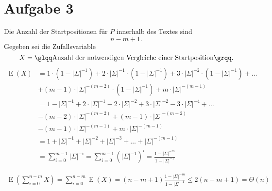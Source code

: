 \documentclass[a4paper, 11pt]{article}
\begin{document}
    \section*{Aufgabe 3}
    \newcommand{\Sig}[1]{|\Sigma|^{#1}}

    Die Anzahl der Startpositionen für $P$ innerhalb des Textes sind
    \begin{equation*}
        n - m + 1
        \text{.}
    \end{equation*}
    Gegeben sei die Zufallsvariable
    \begin{equation*}
        X = \text{{\glqq}Anzahl der notwendigen Vergleiche einer Startposition{\grqq}}
        \text{.}
    \end{equation*}
    \begin{align*}
        \operatorname{E}(X) &=
        1 \cdot \left( 1 - \Sig{-1} \right) + 2 \cdot \Sig{-1} \cdot \left( 1 - \Sig{-1} \right) + 3 \cdot \Sig{-2} \cdot \left( 1 - \Sig{-1} \right) + \dots \\
        &+ (m - 1) \cdot \Sig{-(m - 2)} \cdot \left( 1 - \Sig{-1} \right) + m \cdot \Sig{-(m - 1)} \\
        &= 1 - \Sig{-1} + 2 \cdot \Sig{-1} - 2 \cdot \Sig{-2} + 3 \cdot \Sig{-2} - 3 \cdot \Sig{-4} + \dots \\
        &- (m - 2) \cdot \Sig{-(m - 2)} + (m - 1) \cdot \Sig{-(m - 2)} \\
        &- (m - 1) \cdot \Sig{-(m - 1)} + m \cdot \Sig{-(m - 1)} \\
        &= 1 + \Sig{-1} + \Sig{-2} + \Sig{-3} + \dots + \Sig{-(m - 1)} \\
        &= \sum_{i = 0}^{m - 1}{\Sig{-i}} = \sum_{i = 0}^{m - 1}{\left( \Sig{-1} \right)^i} = \frac{1 - \Sig{-m}}{1 - \Sig{-1}}
    \end{align*}

    \begin{align*}
        \operatorname{E}\left( \sum_{i = 0}^{n - m}{X} \right) =
        \sum_{i = 0}^{n - m}{\operatorname{E}\left( X \right)} =
        (n - m + 1)\frac{1 - \Sig{-m}}{1 - \Sig{-1}} \leq 2 (n - m + 1) = \Theta(n)
    \end{align*}

    \newpage
\end{document}

